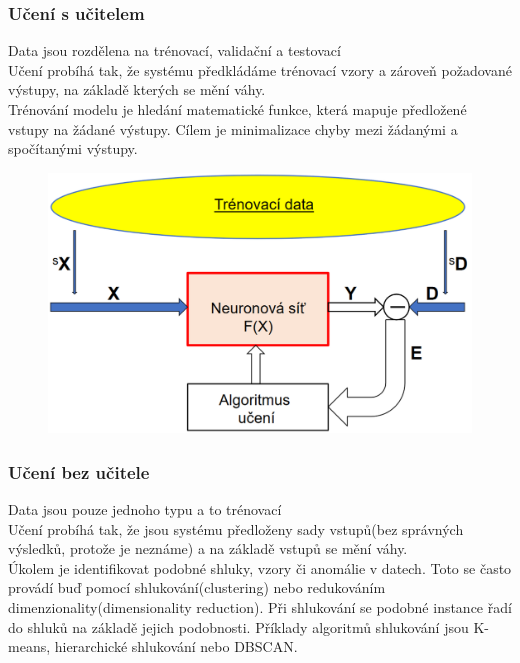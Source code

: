 \subsubsection{Učení s učitelem}
\label{typ_uceni}
Data jsou rozdělena na trénovací, validační a testovací\\
Učení probíhá tak, že systému předkládáme trénovací vzory a zároveň požadované výstupy, na základě kterých se mění váhy.\\
Trénování modelu je hledání matematické funkce, která mapuje předložené vstupy na žádané výstupy. Cílem je minimalizace chyby mezi žádanými a spočítanými výstupy.\\
\newpage
\begin{figure}[h!]
    \includegraphics[scale = 0.3]{images/sUcitelem.png}
\end{figure}

\subsubsection{Učení bez učitele}
Data jsou pouze jednoho typu a to trénovací\\
Učení probíhá tak, že jsou systému předloženy sady vstupů(bez správných výsledků, protože je neznáme) a na základě vstupů se mění váhy.\\

Úkolem je identifikovat podobné shluky, vzory či anomálie v datech. Toto se často provádí buď pomocí shlukování(clustering) nebo redukováním dimenzionality(dimensionality reduction). Při shlukování se podobné instance řadí do shluků na základě jejich podobnosti. Příklady algoritmů shlukování jsou K-means, hierarchické shlukování nebo DBSCAN.

